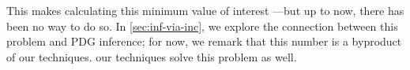 This makes calculating this minimum value of interest%
---but up to now, there has been no way to do so.
In \cref{sec:inf-via-inc}, we explore the
connection between this problem and PDG inference; 
for now, we remark that this number is a byproduct of our techniques.
 our techniques solve this problem as well.


